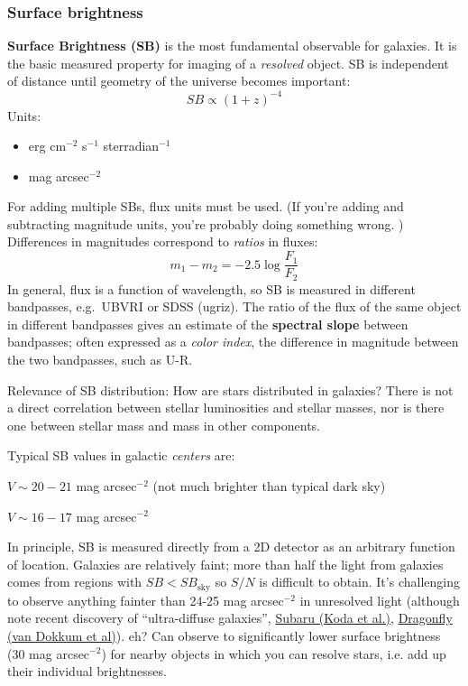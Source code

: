 \documentclass{article}
\newcommand{\mynotes}[1]{\textcolor{cadmiumgreen}{#1}}
\begin{document}
\subsubsection{Surface brightness}
\textbf{Surface Brightness (SB)} is the most fundamental observable for galaxies.
It is the basic measured property for imaging of a \emph{resolved} object.
\textcolor{bred}{SB is independent of distance until geometry of the
universe becomes important:}
\[
    SB \propto (1+z)^{-4}
    \]
Units:
\begin{itemize}
    \item erg cm$^{-2}$ s$^{-1}$ sterradian$^{-1}$
    \item mag arcsec$^{-2}$
\end{itemize}
For adding multiple SBs, flux units must be used.
\mynotes{(If you're adding and subtracting magnitude units, you're probably
doing something wrong. \Smiley)}
Differences in magnitudes correspond to \emph{ratios} in fluxes:
\[
    m_{1} - m_{2} = -2.5\log\frac{F_{1}}{F_{2}}
    \]
In general, flux is a function of wavelength, so SB is measured in different
bandpasses, e.g.\ UBVRI or SDSS (ugriz). The ratio of the flux of the same
object in different bandpasses gives an estimate of the \textbf{spectral slope}
between bandpasses; often expressed as a \emph{color index}, the difference in
magnitude between the two bandpasses, such as U-R.



Relevance of SB distribution:
\textcolor{bred}{How are stars distributed in galaxies?}
There is not a direct correlation between stellar luminosities and stellar masses,
nor is there one between stellar mass and mass in other components.



Typical SB values in galactic \emph{centers} are:
\begin{description}[align=right,labelwidth=5em]
    \item [Spiral] $V \sim 20 - 21$ mag arcsec$^{-2}$
        (not much brighter than typical dark sky)
    \item [Elliptical] $V \sim 16 - 17$ mag arcsec$^{-2}$
\end{description}
In principle, SB is measured directly from a 2D detector as an arbitrary
function of location.
Galaxies are relatively faint;
more than half the light from galaxies comes from regions with
$SB < SB_{\mathrm{sky}}$ so $S/N$ is difficult to obtain.
It's challenging to observe anything fainter than 24-25 mag arcsec$^{-2}$
in unresolved light
(although note recent discovery of ``ultra-diffuse galaxies'',
\href{https://arxiv.org/abs/1506.01712}
{Subaru (Koda et al.)},
\href{http://arxiv.org/abs/1410.8141}
{Dragonfly (van Dokkum et al)}). \mynotes{eh?}
Can observe to significantly lower surface
brightness (30 mag arcsec$^{-2}$) for nearby objects in which you can resolve
stars, i.e. add up their individual brightnesses.
\end{document}
